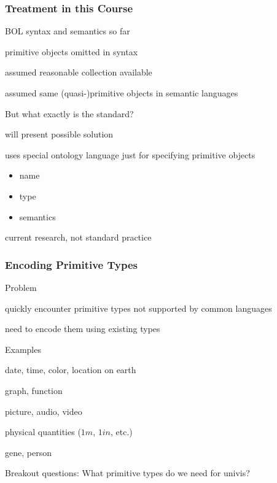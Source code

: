 \documentclass{beamer}
\begin{document}
\begin{frame}\frametitle{Treatment in this Course}
\begin{blockitems}{BOL syntax and semantics so far}
\item primitive objects omitted in syntax
\item assumed reasonable collection available
\item assumed same (quasi-)primitive objects in semantic languages
\end{blockitems}

\begin{blockitems}{But what exactly is the standard?}
\item will present possible solution
\item uses special ontology language just for specifying primitive objects
  \begin{itemize}
   \item name
   \item type
   \item semantics
  \end{itemize}
\item current research, not standard practice
\end{blockitems}
\end{frame}

\begin{frame}\frametitle{Encoding Primitive Types}
\begin{blockitems}{Problem}
 \item quickly encounter primitive types not supported by common languages
 \item need to encode them using existing types
\end{blockitems}

\begin{blockitems}{Examples}
\item date, time, color, location on earth
\item graph, function
\item picture, audio, video
\item physical quantities ($1m$, $1in$, etc.)
\item gene, person
\end{blockitems}

\begin{center}
Breakout questions: What primitive types do we need for univis?
\end{center}
\end{frame}
\end{document}
